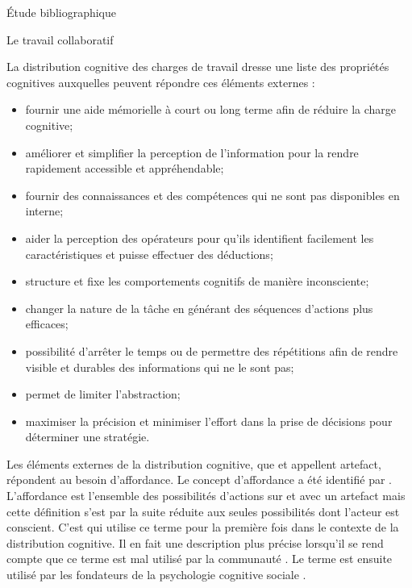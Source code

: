 \documentclass[myfrancais,ngerman,english,frenchb]{mythesis}
\begin{document}
\begin{mychapter}{Étude bibliographique}
\begin{mysection}{Le travail collaboratif}
\begin{mysubsection}{La distribution cognitive des charges de travail}
				 dresse une liste des propriétés cognitives auxquelles peuvent répondre ces éléments externes :
				\begin{itemize}
					\item fournir une aide mémorielle à court ou long terme afin de réduire la charge cognitive;
					\item améliorer et simplifier la perception de l'information pour la rendre rapidement accessible et appréhendable;
					\item fournir des connaissances et des compétences qui ne sont pas disponibles en interne;
					\item aider la perception des opérateurs pour qu'ils identifient facilement les caractéristiques et puisse effectuer des déductions;
					\item structure et fixe les comportements cognitifs de manière inconsciente;
					\item changer la nature de la tâche en générant des séquences d'actions plus efficaces;
					\item possibilité d'arrêter le temps ou de permettre des répétitions afin de rendre visible et durables des informations qui ne le sont pas;
					\item permet de limiter l'abstraction;
					\item maximiser la précision et minimiser l'effort dans la prise de décisions pour déterminer une stratégie.
				\end{itemize}

				Les éléments externes de la distribution cognitive, que  et  appellent artefact, répondent au besoin d'affordance.
				Le concept d'affordance a été identifié par .
				L'affordance est l'ensemble des possibilités d'actions sur et avec un artefact  mais cette définition s'est par la suite réduite aux seules possibilités dont l'acteur est conscient.
				C'est  qui utilise ce terme pour la première fois dans le contexte de la distribution cognitive.
				Il en fait une description plus précise lorsqu'il se rend compte que ce terme est mal utilisé par la communauté .
				Le terme est ensuite utilisé par les fondateurs de la psychologie cognitive sociale .


\end{mysubsection}
\end{mysection}
\end{mychapter}
\end{document}
